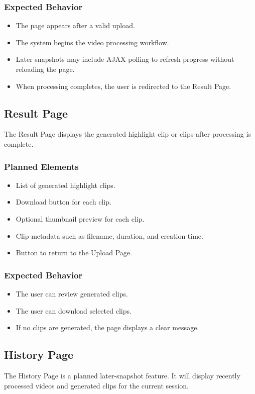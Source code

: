 \documentclass[12pt]{article}
\begin{document}
\subsubsection*{Expected Behavior}
\begin{itemize}[noitemsep]
    \item The page appears after a valid upload.
    \item The system begins the video processing workflow.
    \item Later snapshots may include AJAX polling to refresh progress without reloading the page.
    \item When processing completes, the user is redirected to the Result Page.
\end{itemize}

\subsection{Result Page}
The Result Page displays the generated highlight clip or clips after processing is complete.

\subsubsection*{Planned Elements}
\begin{itemize}[noitemsep]
    \item List of generated highlight clips.
    \item Download button for each clip.
    \item Optional thumbnail preview for each clip.
    \item Clip metadata such as filename, duration, and creation time.
    \item Button to return to the Upload Page.
\end{itemize}

\subsubsection*{Expected Behavior}
\begin{itemize}[noitemsep]
    \item The user can review generated clips.
    \item The user can download selected clips.
    \item If no clips are generated, the page displays a clear message.
\end{itemize}

\subsection{History Page}
The History Page is a planned later-snapshot feature. It will display recently processed videos and generated clips for the current session.
\end{document}
